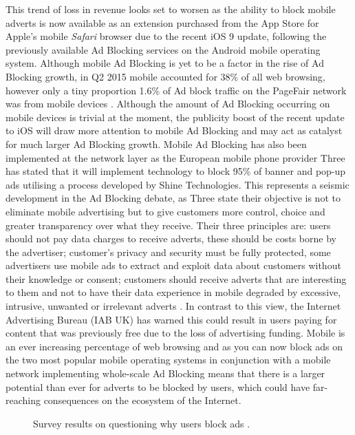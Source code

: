 \documentclass[12pt]{article}
\begin{document}
This trend of loss in revenue looks set to worsen as the ability to block mobile adverts is now available as an extension purchased from the App Store for Apple's mobile \textit{Safari} browser due to the recent iOS 9 update, following the previously available Ad Blocking services on the Android mobile operating system. Although mobile Ad Blocking is yet to be a factor in the rise of Ad Blocking growth, in Q2 2015 mobile accounted for 38\% of all web browsing, however only a tiny proportion 1.6\% of Ad block traffic on the PageFair network was from mobile devices \parencite{adobeAdBlock}. Although the amount of Ad Blocking occurring on mobile devices is trivial at the moment, the publicity boost of the recent update to iOS will draw more attention to mobile Ad Blocking and may act as catalyst for  much larger Ad Blocking growth. Mobile Ad Blocking has also been implemented at the network layer as the European mobile phone provider Three has stated that it will implement technology to block 95\% of banner and pop-up ads utilising a process developed by Shine Technologies. This represents a seismic development in the Ad Blocking debate, as Three state their objective is not to eliminate mobile advertising but to give customers more control, choice and greater transparency over what they receive. Their three principles are: users should not pay data charges to receive adverts, these should be costs borne by the advertiser; customer's privacy and security must be fully protected, some advertisers use mobile ads to extract and exploit data about customers without their knowledge or consent; customers should receive adverts that are interesting to them and not to have their data experience in mobile degraded by excessive, intrusive, unwanted or irrelevant adverts \parencite{threeAdBlock}. In contrast to this view, the Internet Advertising Bureau (IAB UK) has warned this could result in users paying for content that was previously free due to the loss of advertising funding. Mobile is an ever increasing percentage of web browsing and as you can now block ads on the two most popular mobile operating systems in conjunction with a  mobile network implementing whole-scale Ad Blocking means that there is a larger potential than ever for adverts to be blocked by users, which could have far-reaching consequences on the ecosystem of the Internet.  \\

\begin{figure} [H]
    \centering
        \caption{Survey results on questioning why users block ads \parencite{publishersWeb}.}
        \label{fig:adBlockingChart}
\end{figure}
\end{document}

